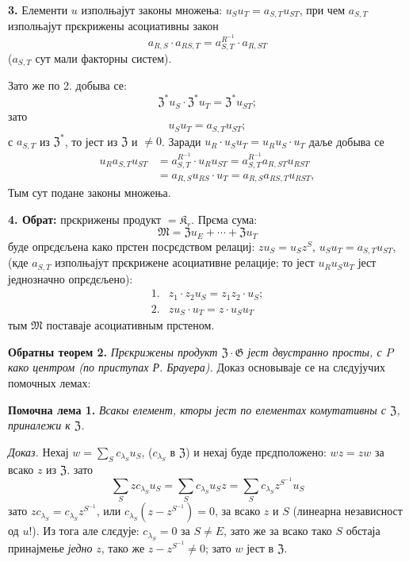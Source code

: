 \documentclass[11pt]{article}
\begin{document}
\noindent\textbf{3.} Елементи \(u\) изполњајут законы множења: \(u_Su_T=a_{S,T}u_{ST}\), при чем \(a_{S,T}\) изполњајут прєкрижены асоциативны закон
\[
a_{R,S}\cdot a_{RS,T}=a_{S,T}^{R^{-1}}\cdot a_{R,ST}
\]
(\(a_{S,T}\) сут мали факторны систем).

Зато же по 2. добыва се:
\[
\mathfrak Z^*u_S\cdot\mathfrak Z^*u_T=\mathfrak Z^*u_{ST};
\]
зато
\[
u_Su_T=a_{S,T}u_{ST};
\]
с \(a_{S,T}\) из \(\mathfrak Z^*\), то јест из \(\mathfrak Z\) и \(\neq0\). Заради \(u_R\cdot u_Su_T=u_Ru_S\cdot u_T\) даље добыва се
\[
\begin{aligned}
u_Ra_{S,T}u_{ST}
&=a_{S,T}^{R^{-1}}\cdot u_Ru_{ST}
 =a_{S,T}^{R^{-1}}a_{R,ST}u_{RST}\\
&=a_{R,S}u_{RS}\cdot u_T
 =a_{R,S}a_{RS,T}u_{RST},
\end{aligned}
\]
Тым сут подане законы множења.

\noindent\textbf{4. Обрат:} прєкрижены продукт \(=\mathfrak K_r\). Прєма сума:
\[
\mathfrak M=\mathfrak Zu_E+\cdots+\mathfrak Zu_T
\]
буде опрєдєљена како прстен посрєдством релациј: \(zu_S=u_Sz^S\), \(u_Su_T=a_{S,T}u_{ST}\), (кде \(a_{S,T}\) изполњајут прєкрижене асоциативне релације; то јест \(u_Ru_Su_T\) јест једнозначно опрєдєљено):
\[
\begin{array}{ll}
1.&z_1\cdot z_2u_S=z_1z_2\cdot u_S;\\[2pt]
2.&zu_S\cdot u_T=z\cdot u_Su_T
\end{array}
\]
тым \(\mathfrak M\) поставаје асоциативным прстеном.

\noindent\textbf{Обратны теорем 2.} \emph{Прєкрижены продукт \(\mathfrak Z\cdot\mathfrak G\) јест двустранно просты, с \(P\) како центром (по приступах Р. Брауера).} Доказ основываје се на слєдујучих помочных лемах:

\noindent\textbf{Помочна лема 1.} \emph{Всакы елемент, кторы јест по елементах комутативны с \(\mathfrak Z\), приналежи к \(\mathfrak Z\).}

\noindent\emph{Доказ.} Нехај \(w=\sum_S c_{\lambda_S}u_S\), (\(c_{\lambda_S}\) в \(\mathfrak Z\)) и нехај буде прєдположено: \(wz=zw\) за всако \(z\) из \(\mathfrak Z\). зато
\[
\sum_S zc_{\lambda_S}u_S
 =\sum_S c_{\lambda_S}u_Sz
 =\sum_S c_{\lambda_S}z^{S^{-1}}u_S
\]
зато \(zc_{\lambda_S}=c_{\lambda_S}z^{S^{-1}}\), или \(c_{\lambda_S}(z-z^{S^{-1}})=0\), за всако \(z\) и \(S\) (линеарна независност од \(u\)!). Из тога але слєдује: \(c_{\lambda_S}=0\) за \(S\neq E\), зато же за всако тако \(S\) обстаја принајмење \emph{једно} \(z\), тако же \(z-z^{S^{-1}}\neq0\); зато \(w\) јест в \(\mathfrak Z\).
\end{document}
